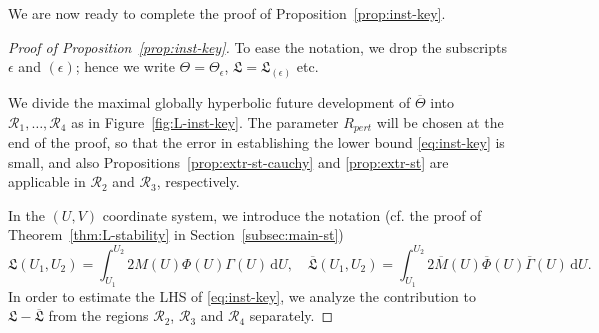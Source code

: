 \documentclass[10pt, reqno]{amsart}
\theoremstyle{definition}
\theoremstyle{remark}
\theoremstyle{conjecture}
\numberwithin{equation}{section}
\newcommand{\ud}{\mathrm{d}}
\newcommand{\0}{\emptyset}
\newcommand{\Gmm}{\Gamma}
\newcommand{\eps}{\epsilon}
\newcommand{\Tht}{\Theta}
\newcommand{\calR}{\mathcal R}
\newcommand{\Phibg}{\overline{\Phi}}				%
\begin{document}
We are now ready to complete the proof of Proposition~\ref{prop:inst-key}.
\begin{proof}[Proof of Proposition~\ref{prop:inst-key}]
To ease the notation, we drop the subscripts $\eps$ and $(\eps)$; hence we write $\Tht = \Tht_{\eps}$, $\mathfrak{L} = \mathfrak{L}_{(\eps)}$ etc.

We divide the maximal globally hyperbolic future development of $\overline{\Tht}$ into $\calR_{1}, \ldots, \calR_{4}$ as in Figure~\ref{fig:L-inst-key}. 
The parameter $R_{pert}$ will be chosen at the end of the proof, so that the error in establishing the lower bound \eqref{eq:inst-key} is small, and also Propositions~\ref{prop:extr-st-cauchy} and \ref{prop:extr-st} are applicable in $\calR_{2}$ and $\calR_{3}$, respectively.

In the $(U, V)$ coordinate system, we introduce the notation (cf. the proof of Theorem~\ref{thm:L-stability} in Section~\ref{subsec:main-st})
\begin{equation*}
\mathfrak{L}(U_{1}, U_{2}) = \int_{U_{1}}^{U_{2}} 2 M(U) \Phi(U) \Gmm(U) \, \ud U, \quad
\overline{\mathfrak{L}}(U_{1}, U_{2}) = \int_{U_{1}}^{U_{2}} 2 \overline{M}(U) \Phibg(U) \overline{\Gmm}(U) \, \ud U.
\end{equation*}
In order to estimate the LHS of \eqref{eq:inst-key}, 
we analyze the contribution to $\mathfrak{L} - \overline{\mathfrak{L}}$ from the regions $\calR_{2}$, $\calR_{3}$ and $\calR_{4}$ separately.


\end{proof}
\end{document}
